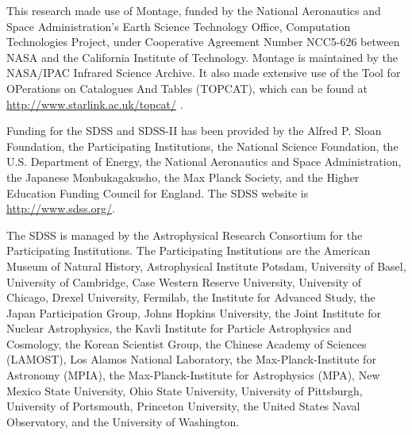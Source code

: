\documentclass[useAMS,usenatbib]{mn2e}
\begin{document}
This research made use of Montage, funded by the National Aeronautics and Space Administration's Earth Science Technology Office, Computation Technologies Project, under Cooperative Agreement Number NCC5-626 between NASA and the California Institute of Technology. Montage is maintained by the NASA/IPAC Infrared Science Archive. It also made extensive use of the Tool for OPerations on Catalogues And Tables (TOPCAT), which can be found at \url{http://www.starlink.ac.uk/topcat/} \citep{tay05,tay11}. 

Funding for the SDSS and SDSS-II has been provided by the Alfred P. Sloan Foundation, the Participating Institutions, the National Science Foundation, the U.S. Department of Energy, the National Aeronautics and Space Administration, the Japanese Monbukagakusho, the Max Planck Society, and the Higher Education Funding Council for England. The SDSS website is \url{http://www.sdss.org/}.

The SDSS is managed by the Astrophysical Research Consortium for the Participating Institutions. The Participating Institutions are the American Museum of Natural History, Astrophysical Institute Potsdam, University of Basel, University of Cambridge, Case Western Reserve University, University of Chicago, Drexel University, Fermilab, the Institute for Advanced Study, the Japan Participation Group, Johns Hopkins University, the Joint Institute for Nuclear Astrophysics, the Kavli Institute for Particle Astrophysics and Cosmology, the Korean Scientist Group, the Chinese Academy of Sciences (LAMOST), Los Alamos National Laboratory, the Max-Planck-Institute for Astronomy (MPIA), the Max-Planck-Institute for Astrophysics (MPA), New Mexico State University, Ohio State University, University of Pittsburgh, University of Portsmouth, Princeton University, the United States Naval Observatory, and the University of Washington.





\bsp
\end{document}
